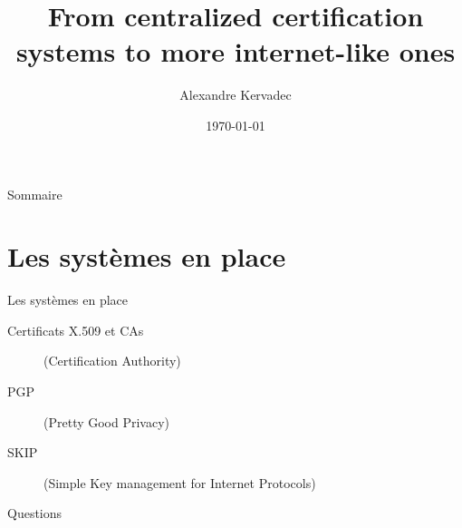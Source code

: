\documentclass{bredelebeamer}
\title[Certification systems]{From centralized certification systems to more internet-like ones}
\subtitle{}
\author{Alexandre Kervadec\inst{1}}
\institute[Université de Bordeaux]
{
  \inst{1}%
  Master 2 Informatique RSM
  }
\date{\today}
\begin{document}
\begin{frame}
  \titlepage
\end{frame}





\begin{frame}{Sommaire}
  \tableofcontents
\end{frame}




\section{Les systèmes en place}

\begin{frame}{Les systèmes en place}

\begin{description}
	\item [Certificats X.509 et CAs] (Certification Authority)
	\item [PGP] (Pretty Good Privacy)
	\item [SKIP] (Simple Key management for Internet Protocols)
\end{description}

\end{frame}


\begin{frame}{Questions}



\end{frame}
\end{document}
